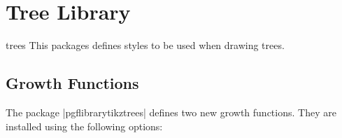 %
%
%


\section{Tree Library}

\label{section-tree-library}


\begin{tikzlibrary}{trees}
  This packages defines styles to be used when drawing trees. 
\end{tikzlibrary}

\subsection{Growth Functions}

The package |pgflibrarytikztrees| defines two new growth
functions. They are installed using the following options:

